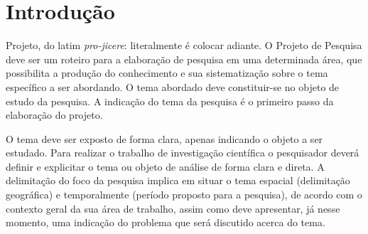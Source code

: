









\textual


\chapter[Introdução]{Introdução}

Projeto, do latim \textit{pro-jicere}: literalmente é colocar adiante. O Projeto de Pesquisa deve ser um roteiro para a elaboração de pesquisa em uma determinada área, que possibilita a produção do conhecimento e sua sistematização sobre o tema específico a ser abordando. O tema abordado deve constituir-se no objeto de estudo da pesquisa. A indicação do tema da pesquisa é o primeiro passo da elaboração do projeto.

O tema deve ser exposto de forma clara, apenas indicando o objeto a ser estudado. Para realizar o trabalho de investigação científica o pesquisador deverá definir e explicitar o tema ou objeto de análise de forma clara e direta. A delimitação do foco da pesquisa implica em situar o tema espacial (delimitação geográfica) e temporalmente (período proposto para a pesquisa), de acordo com o contexto geral da sua área de trabalho, assim como deve apresentar, já nesse momento, uma indicação do problema que será discutido acerca do tema.

